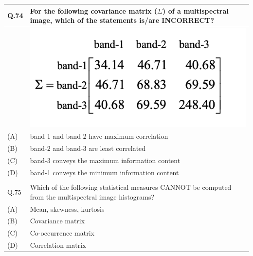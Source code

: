 \documentclass[12pt]{article}
\begin{document}
 \begin{table}[H]
\renewcommand{\arraystretch}{3}
\setlength{\tabcolsep}{8pt}
\begin{tabular}{|l|p{15cm}|}
\hline
 
Q.74&For the following covariance matrix ($\Sigma$) of a multispectral image, which of the
statements is/are INCORRECT?\\ \hline 
&  \includegraphics[scale=1]{LatexImage10.png}\\ \hline
(A)&band-1 and band-2 have maximum correlation\\ \hline
(B)&band-2 and band-3 are least correlated\\ \hline
(C)&band-3 conveys the maximum information content\\ \hline
(D)&band-1 conveys the minimum information content\\ \hline
& \\ \hline

Q.75 &Which of the following statistical measures CANNOT be computed from the
multispectral image histograms?\\ \hline
 
(A)&Mean, skewness, kurtosis\\ \hline
(B)&Covariance matrix\\ \hline
(C)&Co-occurrence matrix\\ \hline
(D)&Correlation matrix\\ \hline


\end{tabular}
\end{table}
\end{document}

